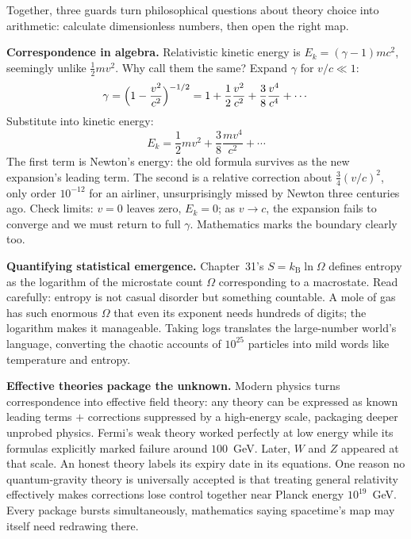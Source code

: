 Together, three guards turn philosophical questions about theory choice into arithmetic: calculate dimensionless numbers, then open the right map.

\begin{mathbridge}
\textbf{Correspondence in algebra.} Relativistic kinetic energy is $E_{k}=(\gamma-1)mc^{2}$, seemingly unlike $\tfrac12 mv^{2}$. Why call them the same? Expand $\gamma$ for $v/c\ll1$:
\[
\gamma=\Bigl(1-\frac{v^{2}}{c^{2}}\Bigr)^{-1/2}=1+\frac12\frac{v^{2}}{c^{2}}+\frac38\frac{v^{4}}{c^{4}}+\cdots
\]
Substitute into kinetic energy:
\[
E_{k}=\frac12 mv^{2}+\frac{3}{8}\frac{mv^{4}}{c^{2}}+\cdots
\]
The first term is Newton's energy: the old formula survives as the new expansion's leading term. The second is a relative correction about $\tfrac34(v/c)^{2}$, only order $10^{-12}$ for an airliner, unsurprisingly missed by Newton three centuries ago. Check limits: $v=0$ leaves zero, $E_{k}=0$; as $v\to c$, the expansion fails to converge and we must return to full $\gamma$. Mathematics marks the boundary clearly too.

\textbf{Quantifying statistical emergence.} Chapter~31's $S=k_{\mathrm{B}}\ln\Omega$ defines entropy as the logarithm of the microstate count $\Omega$ corresponding to a macrostate. Read carefully: entropy is not casual disorder but something countable. A mole of gas has such enormous $\Omega$ that even its exponent needs hundreds of digits; the logarithm makes it manageable. Taking logs translates the large-number world's language, converting the chaotic accounts of $10^{25}$ particles into mild words like temperature and entropy.
\end{mathbridge}

\begin{challenge}
\textbf{Effective theories package the unknown.} Modern physics turns correspondence into effective field theory: any theory can be expressed as known leading terms $+$ corrections suppressed by a high-energy scale, packaging deeper unprobed physics. Fermi's weak theory worked perfectly at low energy while its formulas explicitly marked failure around $100$~GeV. Later, $W$ and $Z$ appeared at that scale. An honest theory labels its expiry date in its equations. One reason no quantum-gravity theory is universally accepted is that treating general relativity effectively makes corrections lose control together near Planck energy $10^{19}$~GeV. Every package bursts simultaneously, mathematics saying spacetime's map may itself need redrawing there.
\end{challenge}

